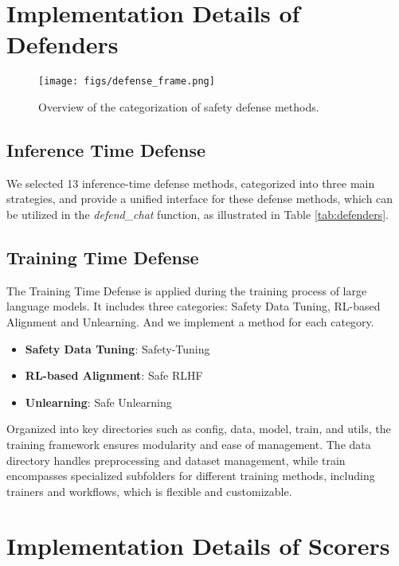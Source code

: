 \section{Implementation Details of Defenders}
\label{app:defender}

\begin{figure*}[!t]
    \centering
    \texttt{[image: figs/defense\_frame.png]}
    \caption{Overview of the categorization of safety defense methods.}
    \label{fig:defense_overview}
\end{figure*}


\subsection{Inference Time Defense}
\label{app:defender1}

We selected 13 inference-time defense methods, categorized into three main strategies, and provide a unified interface for these defense methods, which can be utilized in the \textit{defend\_chat} function, as illustrated in Table \ref{tab:defenders}.

\subsection{Training Time Defense}
\label{app:defender2}
The Training Time Defense is applied during the training process of large language models. It includes three categories: Safety Data Tuning, RL-based Alignment and Unlearning. And we implement a method for each category.

\begin{itemize}
     \item \textbf{Safety Data Tuning}: Safety-Tuning \cite{safe_tuning}
     \item \textbf{RL-based Alignment}: Safe RLHF \cite{dai2023safe}
     \item \textbf{Unlearning}: Safe Unlearning \cite{safe_unlearning}
\end{itemize}

Organized into key directories such as config, data, model, train, and utils, the training framework ensures modularity and ease of management. The data directory handles preprocessing and dataset management, while train encompasses specialized subfolders for different training methods, including trainers and workflows, which is flexible and customizable.

\section{Implementation Details of Scorers}
\label{app:scorer}

